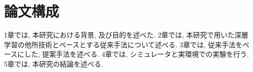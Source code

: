 
\section{論文構成}
1章では, 本研究における背景,  及び目的を述べた. 2章では, 本研究で用いた深層学習の他所技術とベースとする従来手法について述べる. 3章では, 従来手法をベースにした, 提案手法を述べる. 4章では, シミュレータと実環境での実験を行う. 5章では, 本研究の結論を述べる.


\newpage
